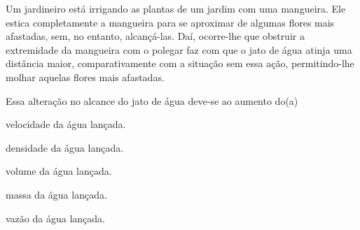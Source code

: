 Um jardineiro está irrigando as plantas de um jardim com uma mangueira. Ele estica completamente a mangueira para se aproximar de algumas flores mais afastadas, sem, no entanto, alcançá-las. Daí, ocorre-lhe que obstruir a extremidade da mangueira com o polegar faz com que o jato de água atinja uma distância maior, comparativamente com a situação sem essa ação, permitindo-lhe molhar aquelas flores mais afastadas.\par
Essa alteração no alcance do jato de água deve-se ao aumento do(a)\par
\begin{alternativas}
  \item velocidade da água lançada.
  \item densidade da água lançada.
  \item volume da água lançada.
  \item massa da água lançada.
  \item vazão da água lançada.
\end{alternativas}
